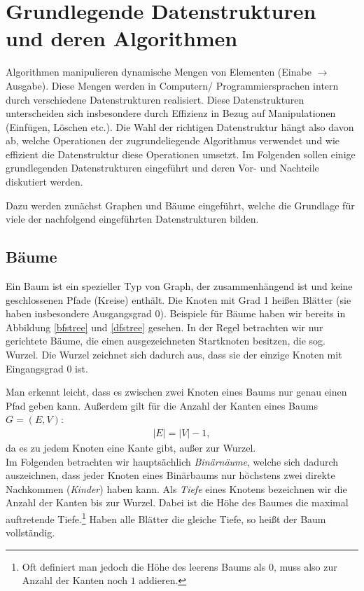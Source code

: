 \section{Grundlegende Datenstrukturen und deren Algorithmen}
Algorithmen manipulieren dynamische Mengen von Elementen (Einabe $\rightarrow$ Ausgabe). Diese Mengen werden in Computern/ Programmiersprachen intern durch verschiedene Datenstrukturen realisiert. Diese Datenstrukturen unterscheiden sich insbesondere durch Effizienz in Bezug auf Manipulationen (Einfügen, Löschen etc.). Die Wahl der richtigen Datenstruktur hängt also davon ab, welche Operationen der zugrundeliegende Algorithmus verwendet und wie effizient die Datenstruktur diese Operationen umsetzt. Im Folgenden sollen einige grundlegenden Datenstrukturen eingeführt und deren Vor- und Nachteile diskutiert werden.

Dazu werden zunächst Graphen und Bäume eingeführt, welche die Grundlage für viele der nachfolgend eingeführten Datenstrukturen bilden.


\subsection{Bäume}
Ein Baum ist ein spezieller Typ von Graph, der zusammenhängend ist und keine geschlossenen Pfade (Kreise) enthält. Die Knoten mit Grad 1 heißen Blätter (sie haben insbesondere Ausgangsgrad 0). Beispiele für Bäume haben wir bereits in Abbildung \ref{bfstree} und \ref{dfstree} gesehen. In der Regel betrachten wir nur gerichtete Bäume, die einen ausgezeichneten Startknoten besitzen, die sog. Wurzel. Die Wurzel zeichnet sich dadurch aus, dass sie der einzige Knoten mit Eingangsgrad 0 ist. 

Man erkennt leicht, dass es zwischen zwei Knoten eines Baums nur genau einen Pfad geben kann. Außerdem gilt für die Anzahl der Kanten eines Baums $G = (E,V)$:
\begin{gather*}
	|E| = |V| - 1,
\end{gather*}
da es zu jedem Knoten eine Kante gibt, außer zur Wurzel.\\

Im Folgenden betrachten wir hauptsächlich \emph{Binärnäume}, welche sich dadurch auszeichnen, dass jeder Knoten eines Binärbaums nur höchstens zwei direkte Nachkommen (\emph{Kinder}) haben kann.
Als \emph{Tiefe} eines Knotens bezeichnen wir die Anzahl der Kanten bis zur Wurzel. Dabei ist die Höhe des Baumes die maximal auftretende Tiefe.\footnote{Oft definiert man jedoch die Höhe des leerens Baums als $0$, muss also zur Anzahl der Kanten noch $1$ addieren.} Haben alle Blätter die gleiche Tiefe, so heißt der Baum vollständig.

